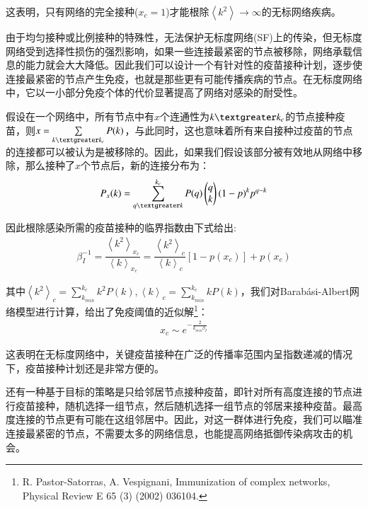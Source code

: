 \documentclass[UTF8]{ctexart}
\begin{document}
\par 这表明，只有网络的完全接种($x_{c}=1$)才能根除$\left\langle k^{2}\right\rangle\to \infty$的无标网络疾病。
\par 由于均匀接种或比例接种的特殊性，无法保护无标度网络(SF)上的传染，但无标度网络受到选择性损伤的强烈影响，如果一些连接最紧密的节点被移除，网络承载信息的能力就会大大降低。因此我们可以设计一个有针对性的疫苗接种计划，逐步使连接最紧密的节点产生免疫，也就是那些更有可能传播疾病的节点。在无标度网络中，它以一小部分免疫个体的代价显著提高了网络对感染的耐受性。
\par 假设在一个网络中，所有节点中有$x$个连通性为$k\textgreater k_{c}$的节点接种疫苗，则$x=\sum\limits_{k\textgreater k_{c}}P(k)$，与此同时，这也意味着所有来自接种过疫苗的节点的连接都可以被认为是被移除的。因此，如果我们假设该部分被有效地从网络中移除，那么接种了$x$个节点后，新的连接分布为：
\begin{equation}
	\begin{aligned}
		P_{x}(k)=\sum\limits_{q\textgreater k}^{k_{c}}P(q)\left( \begin{matrix}
			q  \\
			k  \\
		\end{matrix} \right)(1-p)^{k}p^{q-k}
	\end{aligned}
\end{equation}
\par 因此根除感染所需的疫苗接种的临界指数由下式给出:
    \begin{equation}
	\begin{aligned}
		\beta_{I}^{-1}=\dfrac{\left\langle k^{2}\right\rangle_{x_{c}}}{\left\langle k\right\rangle_{x_{c}}}=\dfrac{\left\langle k^{2}\right\rangle_{c}}{\left\langle k\right\rangle_{c}}[1-p(x_{c})]+p(x_{c})
		\end{aligned}
	\end{equation}
	\par 其中$\left\langle k^{2}\right\rangle_{c}=\sum\limits_{k_{min}}^{k_{c}}k^{2}P(k),\left\langle k\right\rangle_{c}=\sum\limits_{k_{min}}^{k_{c}}kP(k)$，我们对Barabási-Albert网络模型进行计算，给出了免疫阈值的近似解\footnote{R. Pastor-Satorras, A. Vespignani, Immunization of complex networks, Physical Review E 65 (3) (2002) 036104.}：
    \begin{equation}
	\begin{aligned}
		x_{c}\sim e^{-\frac{2}{k_{min}\beta_{I}}}
	\end{aligned}
    \end{equation}
	\par 这表明在无标度网络中，关键疫苗接种在广泛的传播率范围内呈指数递减的情况下，疫苗接种计划还是非常方便的。
	\par 还有一种基于目标的策略是只给邻居节点接种疫苗，即针对所有高度连接的节点进行疫苗接种，随机选择一组节点，然后随机选择一组节点的邻居来接种疫苗。最高度连接的节点更有可能在这组邻居中。因此，对这一群体进行免疫，我们可以瞄准连接最紧密的节点，不需要太多的网络信息，也能提高网络抵御传染病攻击的机会。
\end{document}
